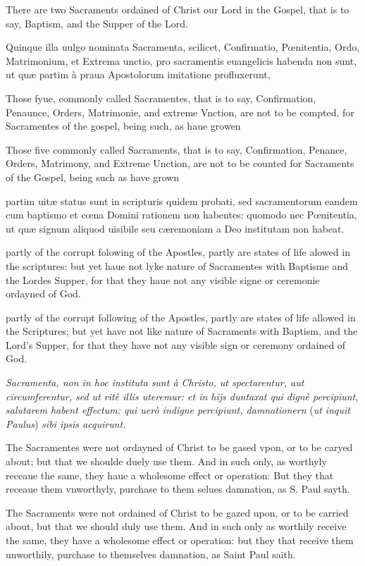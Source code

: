 There are two Sacraments ordained of Christ our Lord in the Gospel, that is to say, Baptism, and the Supper of the Lord.

Quinque illa uulgo nominata Sacramenta, scilicet, Confirmatio, Pœnitentia, Ordo, Matrimonium, et Extrema unctio, pro sacramentis euangelicis habenda non sunt, ut quæ partim à praua Apostolorum imitatione profluxerunt,

Those fyue, commonly called Sacramentes, that is to say, Confirmation, Penaunce, Orders, Matrimonie, and extreme Vnction, are not to be compted, for Sacramentes of the gospel, being such, as haue growen

Those five commonly called Sacraments, that is to say, Confirmation, Penance, Orders, Matrimony, and Extreme Unction, are not to be counted for Sacraments of the Gospel, being such as have grown

partim uitæ status sunt in scripturis quidem probati, sed sacramentorum eandem cum baptismo et cœna Domini rationem non habentes: quomodo nec Pœnitentia, ut quæ signum aliquod uisibile seu cæremoniam a Deo institutam non habeat.

partly of the corrupt folowing of the Apostles, partly are states of life alowed in the scriptures: but yet haue not lyke nature of Sacramentes with Baptisme and the Lordes Supper, for that they haue not any visible signe or ceremonie ordayned of God.

partly of the corrupt following of the Apostles, partly are states of life allowed in the Scriptures; but yet have not like nature of Sacraments with Baptism, and the Lord's Supper, for that they have not any visible sign or ceremony ordained of God.

\emph{Sacramenta, non in hoc instituta sunt à Christo, ut spectarentur, aut circumferentur, sed ut ritè illis uteremur: et in hijs duntaxat qui dignè percipiunt, salutarem habent effectum: qui uerò indigne percipiunt, damnationern} (\emph{ut inquit Paulus}) \emph{sibi ipsis acquirunt.}

The Sacramentes were not ordayned of Christ to be gased vpon, or to be caryed about; but that we shoulde duely use them. And in such only, as worthyly receaue the same, they haue a wholesome effect or operation: But they that receaue them vnworthyly, purchase to them selues damnation, as S. Paul sayth.

The Sacraments were not ordained of Christ to be gazed upon, or to be carried about, but that we should duly use them. And in such only as worthily receive the same, they have a wholesome effect or operation: but they that receive them unworthily, purchase to themselves damnation, as Saint Paul saith.

